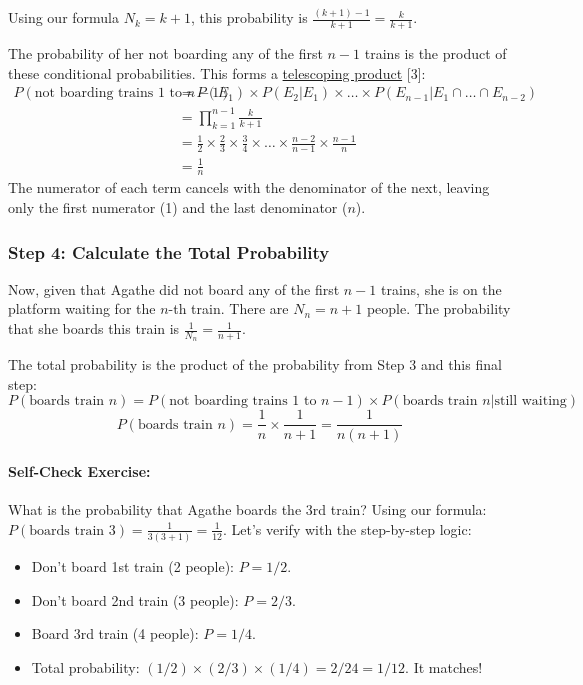 \documentclass[11pt,a4paper]{article}
\begin{document}
Using our formula $N_k = k+1$, this probability is $\frac{(k+1)-1}{k+1} = \frac{k}{k+1}$.

The probability of her not boarding any of the first $n-1$ trains is the product of these conditional probabilities. This forms a \hyperlink{note3}{telescoping product} [3]:
\begin{align*}
    P(\text{not boarding trains } 1 \text{ to } n-1) &= P(E_1) \times P(E_2|E_1) \times \dots \times P(E_{n-1}|E_1 \cap \dots \cap E_{n-2}) \\
    &= \prod_{k=1}^{n-1} \frac{k}{k+1} \\
    &= \frac{1}{2} \times \frac{2}{3} \times \frac{3}{4} \times \dots \times \frac{n-2}{n-1} \times \frac{n-1}{n} \\
    &= \frac{1}{n}
\end{align*}
The numerator of each term cancels with the denominator of the next, leaving only the first numerator (1) and the last denominator ($n$).

\subsubsection*{Step 4: Calculate the Total Probability}
Now, given that Agathe did not board any of the first $n-1$ trains, she is on the platform waiting for the $n$-th train. There are $N_n = n+1$ people. The probability that she boards this train is $\frac{1}{N_n} = \frac{1}{n+1}$.

The total probability is the product of the probability from Step 3 and this final step:
$$ P(\text{boards train } n) = P(\text{not boarding trains } 1 \text{ to } n-1) \times P(\text{boards train } n | \text{still waiting}) $$
$$ P(\text{boards train } n) = \frac{1}{n} \times \frac{1}{n+1} = \frac{1}{n(n+1)} $$

\paragraph{Self-Check Exercise:} What is the probability that Agathe boards the 3rd train?
Using our formula: $P(\text{boards train } 3) = \frac{1}{3(3+1)} = \frac{1}{12}$.
Let's verify with the step-by-step logic:
\begin{itemize}
    \item Don't board 1st train (2 people): $P = 1/2$.
    \item Don't board 2nd train (3 people): $P = 2/3$.
    \item Board 3rd train (4 people): $P = 1/4$.
    \item Total probability: $(1/2) \times (2/3) \times (1/4) = 2/24 = 1/12$. It matches!
\end{itemize}
\end{document}
